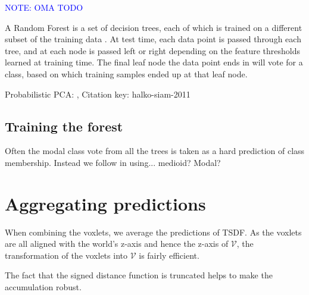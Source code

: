 \documentclass[10pt,twocolumn,letterpaper]{article}
\makeatletter
\renewcommand*{\eg}{e.g.\@\xspace}
\newcommand{\voxelgrid}{\mathcal{V}}
\newcommand{\note}[1]{\textcolor{blue}{NOTE: #1}}
\makeatother
\begin{document}
\note{OMA TODO}

A Random Forest is a set of decision trees, each of which is trained on a different subset of the training data \cite{breiman-ml-2001}.
At test time, each data point is passed through each tree, and at each node is passed left or right depending on the feature thresholds learned at training time. The final leaf node the data point ends in will vote for a class, based on which training samples ended up at that leaf node.

Probabilistic PCA: \cite{halko-siam-2011}, Citation key: halko-siam-2011


\subsection{Training the forest}

Often the modal class vote from all the trees is taken as a hard prediction of class membership. Instead we follow \cite{} in using... medioid? Modal?



\section{Aggregating predictions}
\label{sec:combining}

When combining the voxlets, we average the predictions of TSDF.
As the voxlets are all aligned with the world's z-axis and hence the z-axis of $\voxelgrid$, the transformation of the voxlets into $\voxelgrid$ is fairly efficient.

The fact that the signed distance function is truncated helps to make the accumulation robust.




\end{document}

